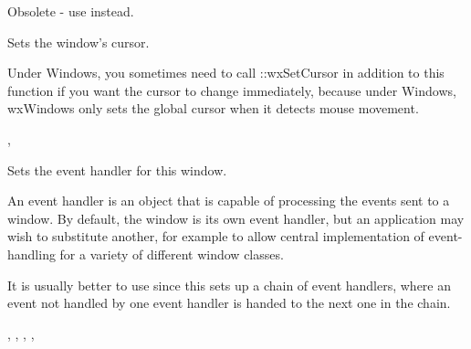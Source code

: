 Obsolete - use  instead.

\label{wxwindowsetcursor}


Sets the window's cursor.




Under Windows, you sometimes need to call ::wxSetCursor in addition to this
function if you want the cursor to change immediately, because under Windows,
wxWindows only sets the global cursor when it detects mouse movement.


, 

\label{wxwindowseteventhandler}


Sets the event handler for this window.




An event handler is an object that is capable of processing the events
sent to a window. By default, the window is its own event handler, but
an application may wish to substitute another, for example to allow
central implementation of event-handling for a variety of different
window classes.

It is usually better to use  since
this sets up a chain of event handlers, where an event not handled by one event handler is
handed to the next one in the chain.


,\rtfsp
{},\rtfsp
{},\rtfsp
{},\rtfsp
{}

